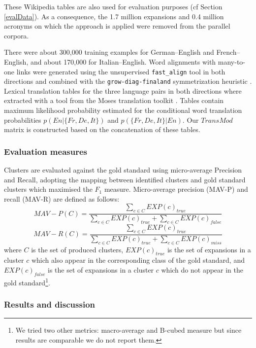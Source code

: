 \documentclass[output=paper]{langsci/langscibook}
\begin{document}
These Wikipedia tables are also used for evaluation purposes (cf
Section \ref{evalData}). As a consequence, the 1.7 million expansions
and 0.4 million acronyms on which the approach is applied were removed
from the parallel corpora.

There were about 300,000 training examples for German--English and
French--English, and about 170,000 for Italian--English.  Word
alignments with many-to-one links were generated using the
unsupervised {\tt fast\_align} tool \citep{dyer-13} in both directions
and combined with the {\tt grow-diag-final\-and} symmetrization
heuristic \citep{koehn-03}. Lexical translation tables for the three
language pairs in both directions where extracted with a tool from the
Moses translation toolkit \citep{koehn-07}. Tables contain maximum
likelihood probability estimated for the conditional word translation
probabilities $p(En|\{Fr,De,It\})$ and $p(\{Fr,De,It\}|En)$. Our
$TransMod$ matrix is constructed based on the concatenation of these
tables.



\subsubsection{Evaluation measures}

Clusters are evaluated against the gold standard using micro-average
Precision and Recall, adopting the mapping between identified clusters
and gold standard clusters which maximised the $F_1$
measure. Micro-average precision (MAV-P) and recall (MAV-R) are
defined as follows:
\begin{equation}
MAV-P (C) = \frac{\sum_{c \in C}{EXP(c)_{true}}}{\sum_{c \in C}{EXP(c)_{true}}+\sum_{c \in
 C}{EXP(c)_{false}}}
\end{equation}
\begin{equation}
MAV-R (C) = \frac{\sum_{c \in C}{EXP(c)_{true}}}{\sum_{c \in C}{EXP(c)_{true}}+\sum_{c \in C}{EXP(c)_{miss}}}
\end{equation}
where $C$ is the set of produced clusters, $EXP(c)_{true}$ is the set
of expansions in a cluster $c$ which also appear in the corresponding
class of the gold standard, and $EXP(c)_{false}$ is the set of
expansions in a cluster $c$ which do not appear in the gold
standard\footnote{We tried two other metrics: macro-average and
  B-cubed measure \citep{bagga-98} but since results are comparable we
  do not report them.}.

\subsubsection{Results and discussion}
\label{results}
\end{document}
